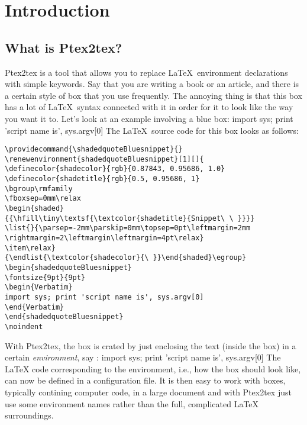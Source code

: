 \documentclass[a4paper,11pt]{article}
\begin{document}

\section{Introduction}
\subsection{What is Ptex2tex?}
Ptex2tex is a tool that allows you to replace \LaTeX~environment declarations
with simple keywords. Say that you are writing a book or an article, and there
is a certain style of box that you use frequently. The annoying thing is that
this box has a lot of \LaTeX~syntax connected with it in order for it to look like
the way you want it to. Let's look at an example involving a blue box:
\bsni
import sys; print 'script name is', sys.argv[0]
\esni
The \LaTeX~source code for this box looks as follows:
\begin{verbatim}
\providecommand{\shadedquoteBluesnippet}{}
\renewenvironment{shadedquoteBluesnippet}[1][]{
\definecolor{shadecolor}{rgb}{0.87843, 0.95686, 1.0}
\definecolor{shadetitle}{rgb}{0.5, 0.95686, 1}
\bgroup\rmfamily
\fboxsep=0mm\relax
\begin{shaded}
{{\hfill\tiny\textsf{\textcolor{shadetitle}{Snippet\ \ }}}}
\list{}{\parsep=-2mm\parskip=0mm\topsep=0pt\leftmargin=2mm
\rightmargin=2\leftmargin\leftmargin=4pt\relax}
\item\relax}
{\endlist{\textcolor{shadecolor}{\ }}\end{shaded}\egroup}
\begin{shadedquoteBluesnippet}
\fontsize{9pt}{9pt}
\begin{Verbatim}
import sys; print 'script name is', sys.argv[0]
\end{Verbatim}
\end{shadedquoteBluesnippet}
\noindent
\end{verbatim}
\noindent
With Ptex2tex, the box is crated by just enclosing the text (inside the box)
in a certain \emph{environment}, say :
\bdat
\bmybox
import sys; print 'script name is', sys.argv[0]
\emybox
\edat
The \LaTeX{} code corresponding to the  environment, i.e.,
how the box should look like, can now be defined in a configuration file. 
It is then easy to work with boxes, typically contining computer code,
in a large document and with Ptex2tex just use some environment names
rather than the full, complicated \LaTeX{} surroundings.
\end{document}
